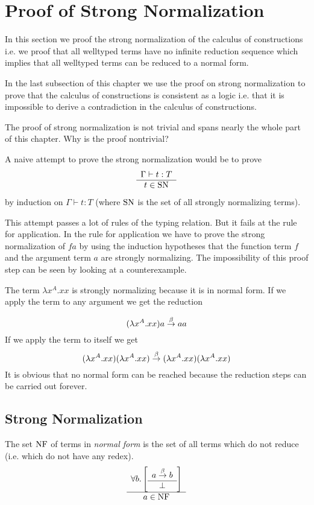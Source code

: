 \section{Proof of Strong Normalization}

In this section we proof the strong normalization of the calculus of
constructions i.e. we proof that all welltyped terms have no infinite reduction
sequence which implies that all welltyped terms can be reduced to a normal form.

In the last subsection of this chapter we use the proof on strong normalization
to prove that the calculus of constructions is consistent as a logic i.e. that
it is impossible to derive a contradiction in the calculus of constructions.

The proof of strong normalization is not trivial and spans nearly the whole part
of this chapter. Why is the proof nontrivial?

A naive attempt to prove the strong normalization would be to prove
$$
    \begin{array}{c} 
        \Gamma \vdash t : T
     \\ \hline  t \in \text{SN} \end{array}
$$
by induction on $\Gamma \vdash t : T$ (where $\text{SN}$ is the set of all strongly
normalizing terms).

This attempt passes a lot of rules of the typing relation. But it fails at the
rule for application. In the rule for application we have to prove the strong
normalization of $f a$ by using the induction hypotheses that the function term
$f$ and the argument term $a$ are strongly normalizing. The impossibility of
this proof step can be seen by looking at a counterexample.

The term $\lambda x^A. x x$ is strongly normalizing because it is in normal
form. If we apply the term to any argument we get the reduction

$$
    (\lambda x^A. x x) a \stackrel{\beta}{\to} a a
$$
%
If we apply the term to itself we get
%
$$
    (\lambda x^A. x x) (\lambda x^A. x x)
    \stackrel{\beta}{\to}
    (\lambda x^A. x x) (\lambda x^A. x x)
$$
%
It is obvious that no normal form can be reached because the reduction steps can
be carried out forever.





\subsection{Strong Normalization}

\begin{definition}
    The set $\text{NF}$ of terms in \emph{normal form} is the set of all terms which
    do not reduce (i.e. which do not have any redex).
    $$
    \begin{array}{c} 
        \forall b. \left[ \begin{array}{c} a \stackrel{\beta}{\to} b \\ \hline \perp\end{array} \right]
     \\ \hline 
        a \in \text{NF}
    \end{array}
    $$
\end{definition}



